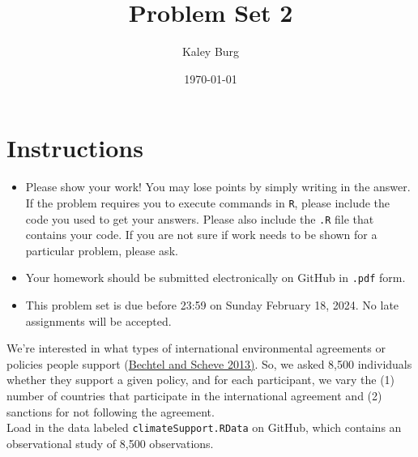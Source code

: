 \documentclass[12pt,letterpaper]{article}
\title{Problem Set 2}
\date{\today}
\author{Kaley Burg}
\begin{document}
	\maketitle
	\section*{Instructions}
	\begin{itemize}
		\item Please show your work! You may lose points by simply writing in the answer. If the problem requires you to execute commands in \texttt{R}, please include the code you used to get your answers. Please also include the \texttt{.R} file that contains your code. If you are not sure if work needs to be shown for a particular problem, please ask.
		\item Your homework should be submitted electronically on GitHub in \texttt{.pdf} form.
		\item This problem set is due before 23:59 on Sunday February 18, 2024. No late assignments will be accepted.
	\end{itemize}

	
	

	\vspace{.25cm}
\noindent We're interested in what types of international environmental agreements or policies people support (\href{https://www.pnas.org/content/110/34/13763}{Bechtel and Scheve 2013)}. So, we asked 8,500 individuals whether they support a given policy, and for each participant, we vary the (1) number of countries that participate in the international agreement and (2) sanctions for not following the agreement. \\

\noindent Load in the data labeled \texttt{climateSupport.RData} on GitHub, which contains an observational study of 8,500 observations.
\end{document}
